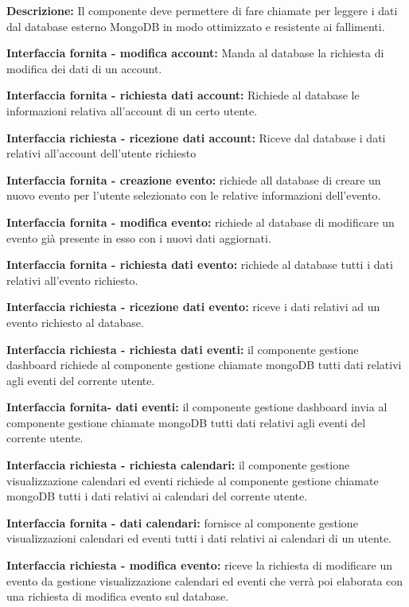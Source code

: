 \begin{listaPersonale}[DCI]{}

    \textbf{Descrizione:} Il componente deve permettere di fare chiamate per leggere i dati dal database esterno MongoDB in modo ottimizzato e resistente ai fallimenti.

    \textbf{Interfaccia fornita - modifica account:} Manda al database la richiesta di modifica dei dati di un account.

    \textbf{Interfaccia fornita - richiesta dati account:} Richiede al database le informazioni relativa all'account di un certo utente.

    \textbf{Interfaccia richiesta - ricezione dati account:} Riceve dal database i dati relativi all'account dell'utente richiesto

    \textbf{Interfaccia fornita - creazione evento:} richiede all database di creare un nuovo evento per l'utente selezionato con le relative informazioni dell'evento.

    \textbf{Interfaccia fornita - modifica evento:} richiede al database di modificare un evento già presente in esso con i nuovi dati aggiornati.

    \textbf{Interfaccia fornita - richiesta dati evento:} richiede al database tutti i dati relativi all'evento richiesto.

    \textbf{Interfaccia richiesta - ricezione dati evento:} riceve i dati relativi ad un evento richiesto al database.

    \textbf{Interfaccia richiesta - richiesta dati eventi:} il componente gestione dashboard richiede al componente gestione chiamate mongoDB tutti dati relativi agli eventi del corrente utente.

    \textbf{Interfaccia fornita- dati eventi:} il componente gestione dashboard invia al componente gestione chiamate mongoDB tutti dati relativi agli eventi del corrente utente.

    \textbf{Interfaccia richiesta - richiesta calendari:} il componente gestione visualizzazione calendari ed eventi richiede al componente gestione chiamate mongoDB tutti i dati relativi ai calendari del corrente utente.

    \textbf{Interfaccia fornita - dati calendari:} fornisce al componente gestione visualizzazioni calendari ed eventi tutti i dati relativi ai calendari di un utente.

    \textbf{Interfaccia richiesta - modifica evento:} riceve la richiesta di modificare un evento da gestione visualizzazione calendari ed eventi che verrà poi elaborata con una richiesta di modifica evento sul database.


\end{listaPersonale}
